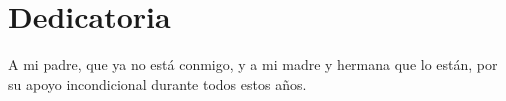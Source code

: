 
\chapter*{Dedicatoria}

A mi padre, que ya no está conmigo, y a mi madre y hermana que lo están, por su apoyo incondicional durante todos estos años.
